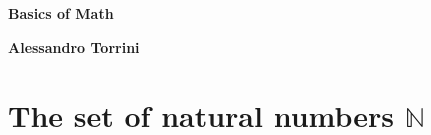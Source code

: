 \documentclass[12pt]{article}
\theoremstyle{remark}
\theoremstyle{definition}
\begin{document}
\begin{titlepage}
  \begin{center}
    \vspace{1cm}
    \Huge
    \textbf{Basics of Math}

    \vspace{2cm}
    \large
    \textbf{Alessandro Torrini}
  \end{center}
\end{titlepage}

\section{The set of natural numbers \( \mathbb{N} \)}
\end{document}
